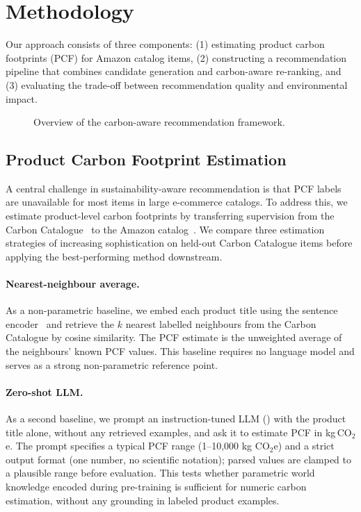 \documentclass[11pt]{article}
\begin{document}
\section{Methodology}\label{sec:methodology}
Our approach consists of three components: (1) estimating product carbon footprints (PCF) for Amazon catalog items, (2) constructing a recommendation pipeline that combines candidate generation and carbon-aware re-ranking, and (3) evaluating the trade-off between recommendation quality and environmental impact.

\begin{figure}[H]
  \centering
  \scalebox{0.78}{}
  \caption{Overview of the carbon-aware recommendation framework.}
  \label{fig:pipeline}
\end{figure}

\subsection{Product Carbon Footprint Estimation}

A central challenge in sustainability-aware recommendation is that PCF labels are
unavailable for most items in large e-commerce catalogs. To address this, we estimate
product-level carbon footprints by transferring supervision from the Carbon
Catalogue~\cite{meinrenken2022carboncatalogue} to the Amazon catalog~\cite{amazon2023}. We
compare three estimation strategies of increasing sophistication on held-out Carbon
Catalogue items before applying the best-performing method downstream.

\paragraph{Nearest-neighbour average.}
As a non-parametric baseline, we embed each product title using the
\texttt{} sentence encoder~\cite{reimers2019sbert} and retrieve the $k$ nearest
labelled neighbours from the Carbon Catalogue by cosine similarity. The PCF estimate is
the unweighted average of the neighbours' known PCF values. This baseline requires no
language model and serves as a strong non-parametric reference point.



\paragraph{Zero-shot LLM.}
As a second baseline, we prompt an instruction-tuned LLM
(\texttt{}) with the product title alone,
without any retrieved examples, and ask it to estimate PCF in kg\,CO$_2$e. The prompt
specifies a typical PCF range (1--10{,}000 kg CO$_2$e) and a strict output format (one
number, no scientific notation); parsed values are clamped to a plausible range before
evaluation. This tests whether parametric world knowledge encoded during pre-training is
sufficient for numeric carbon estimation, without any grounding in labeled product examples.
\end{document}
